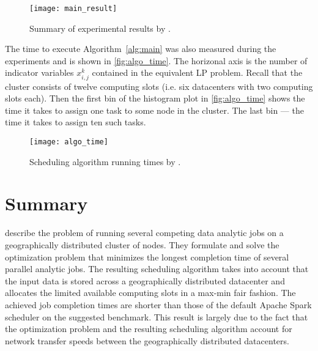 \begin{figure}
  \centering
  \texttt{[image: main\_result]} \\
  \caption{Summary of experimental results by \citet{Chen2017}.}
  \label{fig:main_result}
\end{figure}

The time to execute Algorithm~\ref{alg:main} was also measured during the experiments and is shown in \autoref{fig:algo_time}. The horizonal axis is the number of indicator variables \(x^k_{i, j}\) contained in the equivalent LP problem. Recall that the cluster consists of twelve computing slots (i.e. six datacenters with two computing slots each). Then the first bin of the histogram plot in \autoref{fig:algo_time} shows the time it takes to assign one task to some node in the cluster. The last bin --- the time it takes to assign ten such tasks.

\begin{figure}
  \centering
  \texttt{[image: algo\_time]} \\
  \caption{Scheduling algorithm running times by \citet{Chen2017}.}
  \label{fig:algo_time}
\end{figure}

\section{Summary}

\citet*{Chen2017} describe the problem of running several competing data analytic jobs on a geographically distributed cluster of nodes. They formulate and solve the optimization problem that minimizes the longest completion time of several parallel analytic jobs. The resulting scheduling algorithm takes into account that the input data is stored across a geographically distributed datacenter and allocates the limited available computing slots in a max-min fair fashion. The achieved job completion times are shorter than those of the default Apache Spark scheduler on the suggested benchmark. This result is largely due to the fact that the optimization problem and the resulting scheduling algorithm account for network transfer speeds between the geographically distributed datacenters.
